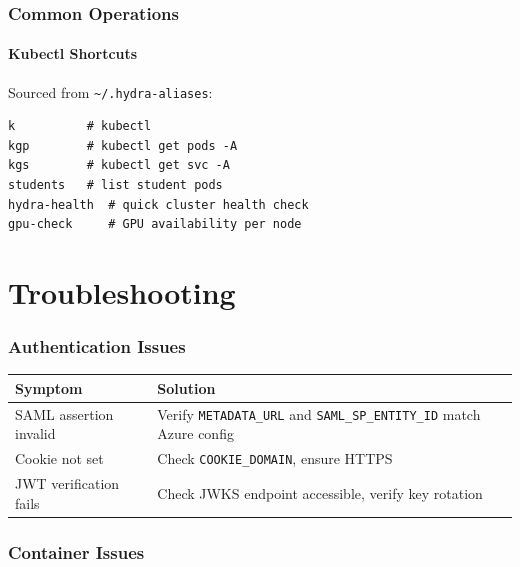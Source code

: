 \documentclass[11pt,a4paper]{article}
\begin{document}
\section{Common Operations}

\subsection{Kubectl Shortcuts}

Sourced from \texttt{\~{}/.hydra-aliases}:
\begin{lstlisting}[style=bash]
k          # kubectl
kgp        # kubectl get pods -A
kgs        # kubectl get svc -A
students   # list student pods
hydra-health  # quick cluster health check
gpu-check     # GPU availability per node
\end{lstlisting}

\newpage
\part{Troubleshooting}

\section{Authentication Issues}

\begin{table}[H]
\centering
\begin{tabular}{lp{8cm}}
\toprule
\textbf{Symptom} & \textbf{Solution} \\
\midrule
SAML assertion invalid & Verify \texttt{METADATA\_URL} and \texttt{SAML\_SP\_ENTITY\_ID} match Azure config \\
Cookie not set & Check \texttt{COOKIE\_DOMAIN}, ensure HTTPS \\
JWT verification fails & Check JWKS endpoint accessible, verify key rotation \\
\bottomrule
\end{tabular}
\end{table}

\section{Container Issues}
\end{document}
